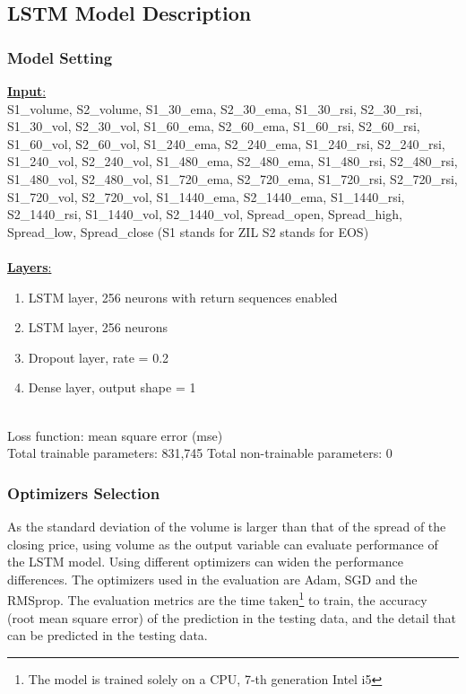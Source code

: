 \documentclass[11pt,a4paper]{article}
\begin{document}
    \subsection{LSTM Model Description}
    \subsubsection{Model Setting}
    \underline{\textbf{Input}:} \\
    S1\_volume, S2\_volume, S1\_30\_ema, S2\_30\_ema, S1\_30\_rsi, S2\_30\_rsi, \\
    S1\_30\_vol, S2\_30\_vol, S1\_60\_ema, S2\_60\_ema, S1\_60\_rsi, S2\_60\_rsi, \\
    S1\_60\_vol, S2\_60\_vol, S1\_240\_ema, S2\_240\_ema, S1\_240\_rsi, S2\_240\_rsi, \\
    S1\_240\_vol, S2\_240\_vol, S1\_480\_ema, S2\_480\_ema, S1\_480\_rsi, S2\_480\_rsi, \\
    S1\_480\_vol, S2\_480\_vol, S1\_720\_ema, S2\_720\_ema, S1\_720\_rsi, S2\_720\_rsi, \\
    S1\_720\_vol, S2\_720\_vol, S1\_1440\_ema, S2\_1440\_ema, S1\_1440\_rsi, \\
    S2\_1440\_rsi, S1\_1440\_vol, S2\_1440\_vol, Spread\_open, Spread\_high, \\
    Spread\_low, Spread\_close (S1 stands for ZIL S2 stands for EOS) \\
    \\
    \underline{\textbf{Layers}:}
    \begin{enumerate}
        \item LSTM layer, 256 neurons with return sequences enabled
        \item LSTM layer, 256 neurons
        \item Dropout layer, rate = 0.2
        \item Dense layer, output shape = 1
    \end{enumerate}
    \\
    Loss function: mean square error (mse) \\
    Total trainable parameters: 831,745
    Total non-trainable parameters: 0
    
    \subsubsection{Optimizers Selection}
    As the standard deviation of the volume is larger than that of the spread of the closing price, using volume as the output variable can evaluate  performance of the LSTM model. Using different optimizers can widen the performance differences. The optimizers used in the evaluation are Adam, SGD and the RMSprop. The evaluation metrics are the time taken\footnote{The model is trained solely on a CPU, 7-th generation Intel i5} to train, the accuracy (root mean square error) of the prediction in the testing data, and the detail that can be predicted in the testing data.
    
\end{document}
